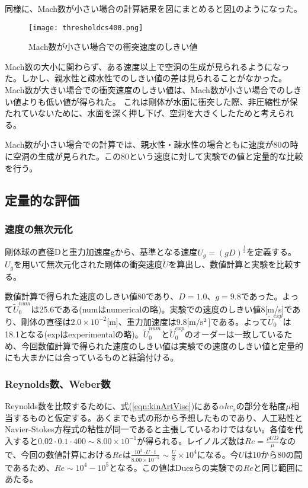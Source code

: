 \documentclass[]{jsarticle}
\begin{document}
同様に、Mach数が小さい場合の計算結果を図にまとめると図\ref{fig:threscs400}のようになった。
 \begin{figure}[H]
  \centering
  \texttt{[image: thresholdcs400.png]}
  \caption{Mach数が小さい場合での衝突速度のしきい値
    \label{fig:threscs400} }
\end{figure}

Mach数の大小に関わらず、ある速度以上で空洞の生成が見られるようになった。しかし、親水性と疎水性でのしきい値の差は見られることがなかった。
Mach数が大きい場合での衝突速度のしきい値は、Mach数が小さい場合でのしきい値よりも低い値が得られた。
これは剛体が水面に衝突した際、非圧縮性が保たれていないために、水面を深く押し下げ、空洞を大きくしたためと考えられる。


Mach数が小さい場合での計算では、親水性・疎水性の場合ともに速度が80の時に空洞の生成が見られた。この80という速度に対して実験での値と定量的な比較を行う。

\subsection{定量的な評価}
\label{subsec:discQuantitative}
\subsubsection{速度の無次元化}
剛体球の直径Dと重力加速度gから、基準となる速度$U_g=\left( gD \right)^{\frac{1}{2}}$を定義する。$U_g$を用いて無次元化された剛体の衝突速度$\tilde{U}$を算出し、数値計算と実験を比較する。


数値計算で得られた速度のしきい値80であり、$D=1.0$、$g=9.8$であった。よって$\tilde{U}_0^{num}$は25.6である(numはnumericalの略)。実験での速度のしきい値8[m/s]であり、剛体の直径は$2.0\times 10^{-2}$[m]、重力加速度は9.8[$\rm{m/s^2}$]である。よって$\tilde{U}_0^{exp}$は18.1となる(expはexperimentalの略)。$\tilde{U}_0^{num}$と$\tilde{U}_0^{exp}$のオーダーは一致しているため、今回数値計算で得られた速度のしきい値は実験での速度のしきい値と定量的にも大まかには合っているものと結論付ける。

\subsubsection{Reynolds数、Weber数}
Reynolds数を比較するために、式(\ref{eqn:kinArtVisc})にある$\alpha h c_s$の部分を粘度$\mu$相当するものと仮定する。あくまでも式の形から予想したものであり、人工粘性とNavier-Stokes方程式の粘性が同一であると主張しているわけではない。各値を代入すると$0.02\cdot 0.1 \cdot 400 \sim 8.00\times 10^{-1}$が得られる。レイノルズ数は$Re=\frac{\rho U D}{\mu}$なので、今回の数値計算における$Re$は$\frac{10^3\cdot U \cdot 1}{8.00\times10^{-1}}\sim \frac{U}{8}\times10^4$になる。今$U$は10から80の間であるため、$Re\sim 10^4-10^5$となる。この値はDuezらの実験での$Re$と同じ範囲にあたる。
\end{document}
